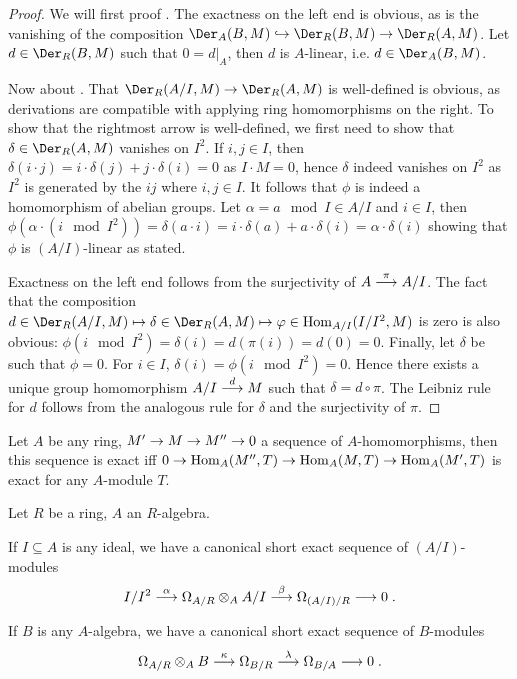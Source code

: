 \documentclass[a4paper,parskip=half,numbers=enddot, DIV=12]{scrreprt}
\begin{document}
\begin{proof}
    We will first proof . The exactness on the left end is obvious, as is the vanishing of the composition $\Der_A(B,M) \monomorphism \Der_R(B,M) \morphism \Der_R(A,M)$. Let $d\in \Der_R(B,M)$ such that $0 = d|_A$, then $d$ is $A$-linear, i.e. $d\in \Der_A(B,M)$.
    
    Now about . That $\Der_R(A/I,M) \morphism \Der_R(A,M)$ is well-defined is obvious, as derivations are compatible with applying ring homomorphisms on the right. To show that the rightmost arrow is well-defined, we first need to show that $\delta\in\Der_R(A,M)$ vanishes on $I^2$. If $i,j\in I$, then $\delta(i\cdot j)=i\cdot\delta(j)+j\cdot\delta(i)=0$ as $I\cdot M=0$, hence $\delta$ indeed vanishes on $I^2$ as $I^2$ is generated by the $ij$ where $i,j\in I$. It follows that $\phi$ is indeed a homomorphism of abelian groups. Let $\alpha = a\mod I\in A/I$ and $i\in I$, then $\phi(\alpha \cdot (i\mod I^2)) = \delta(a\cdot i) = i\cdot \delta(a) + a\cdot \delta(i) = \alpha\cdot\delta(i)$ showing that $\phi$ is $(A/I)$-linear as stated. 
    
    Exactness on the left end follows from the surjectivity of $A\morphism[\pi] A/I$. The fact that the composition $d\in\Der_R(A/I,M)\mapsto\delta\in\Der_R(A,M)\mapsto\phi\in\Hom_{A/I}(I/I^2,M)$ is zero is also obvious: $\phi(i\mod I^2) = \delta(i) = d(\pi(i)) = d(0) = 0$. Finally, let $\delta$ be such that $\phi = 0$. For $i\in I$, $\delta(i) = \phi(i\mod I^2) = 0$. Hence there exists a unique group homomorphism $A/I \morphism[d] M$ such that $\delta = d\circ \pi$. The Leibniz rule for $d$ follows from the analogous rule for $\delta$ and the surjectivity of $\pi$.
\end{proof}
\begin{fact*}
    Let $A$ be any ring, $M'\morphism M\morphism M''\morphism 0$ a sequence of $A$-homomorphisms, then this sequence is exact iff $0\morphism\Hom_A(M'',T) \morphism \Hom_A(M,T) \morphism\Hom_A(M',T)$ is exact for any $A$-module $T$.
\end{fact*}
\begin{cor}
    Let $R$ be a ring, $A$ an $R$-algebra. 
    \begin{alphanumerate}
        \item 
            If $I\subseteq A$ is any ideal, we have a canonical short exact sequence of $(A/I)$-modules
            \begin{align}\lbl{eq:tensorDerSpam1}
                I/I^2\morphism[\alpha] \Omega_{A/R} \otimes_A A/I \morphism[\beta] \Omega_{(A/I)/R} \morphism 0\;.
            \end{align}
        \item 
            If $B$ is any $A$-algebra, we have a canonical short exact sequence of $B$-modules
            \begin{align}\lbl{eq:tensorDerSpam2}
                \Omega_{A/R}\otimes_A B \morphism[\kappa] \Omega_{B/R} \morphism[\lambda] \Omega_{B/A} \morphism 0\;.
            \end{align}
    \end{alphanumerate}
\end{cor}
\end{document}
